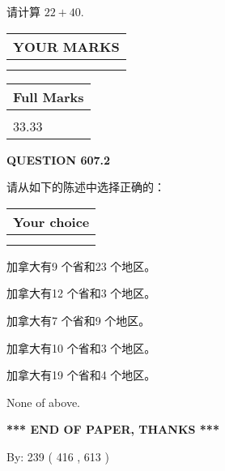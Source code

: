 \documentclass{ctexart}
\begin{document}
  
 
请计算 $ %
22 +  %
40 $.
 

 

 
  
\vspace{0.2in}
  
\noindent\begin{tabular}{|l|}
\hline
 YOUR MARKS  \\
\hline
 \\ 
 \\ 
\hline
\end{tabular}
\hspace{0.05in} \begin{tabular}{|l|}
\hline
 Full Marks  \\
\hline
 \\ 
33.33 \\
\hline
\end{tabular}
{\textbf{\Large{QUESTION
607.2 
}}}
  
  
请从如下的陈述中选择正确的：
  
  
\noindent\hspace{3.0in} \begin{tabular}{|l|}
\hline
Your choice \\
\hline
 \\ 
 \\ 
\hline
\end{tabular}
  
  
 
 
加拿大有9 个省和23 个地区。
 
 
加拿大有12 个省和3 个地区。
 
 
加拿大有7 个省和9 个地区。
 
 
加拿大有10 个省和3 个地区。
 
 
加拿大有19 个省和4 个地区。
 
 
 None of above.
 
 
   
   
 \vspace{0.2in}
 
   
   
   
   
\vspace{1.0in} 
{\textbf{\large{ *** END OF PAPER, THANKS *** }}} 
   
   
\hspace{1.0in} By: 
 239 ( 416 ,  613 )
   
\end{document}

